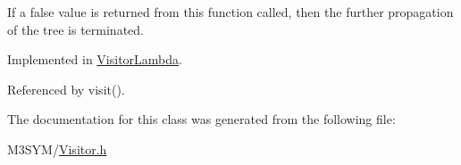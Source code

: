 If a false value is returned from this function called, then the further propagation of the tree is terminated. 

Implemented in \hyperlink{classVisitorLambda_af934df1d8669dd315d824d9ee706f250}{Visitor\+Lambda}.



Referenced by visit().



The documentation for this class was generated from the following file\+:\begin{DoxyCompactItemize}
\item 
M3\+S\+Y\+M/\hyperlink{Visitor_8h}{Visitor.\+h}\end{DoxyCompactItemize}
